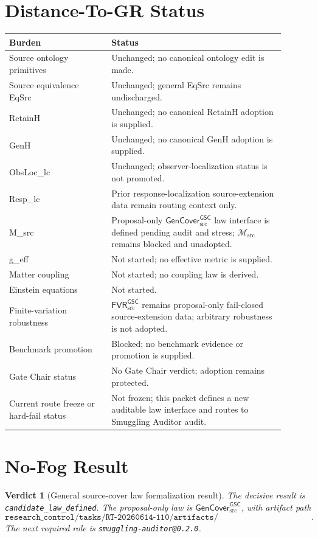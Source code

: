 \documentclass[11pt]{article}
\newcommand{\Msrc}{\mathcal{M}_{\mathrm{src}}}
\newcommand{\FVRSrc}{\mathsf{FVR}_{\mathrm{src}}^{\mathsf{GSC}}}
\newcommand{\GenCover}{\mathsf{GenCover}_{\mathrm{src}}^{\mathsf{GSC}}}
\newtheorem{verdict}{Verdict}
\begin{document}
\section{Distance-To-GR Status}

\begin{center}
\begin{tabular}{p{0.33\linewidth}p{0.57\linewidth}}
\hline
Burden & Status \\
\hline
Source ontology primitives & Unchanged; no canonical ontology edit is made. \\
Source equivalence EqSrc & Unchanged; general EqSrc remains undischarged. \\
RetainH & Unchanged; no canonical RetainH adoption is supplied. \\
GenH & Unchanged; no canonical GenH adoption is supplied. \\
ObsLoc\_lc & Unchanged; observer-localization status is not promoted. \\
Resp\_lc & Prior response-localization source-extension data remain routing context only. \\
M\_src & Proposal-only \(\GenCover\) law interface is defined pending audit and stress; \(\Msrc\) remains blocked and unadopted. \\
g\_eff & Not started; no effective metric is supplied. \\
Matter coupling & Not started; no coupling law is derived. \\
Einstein equations & Not started. \\
Finite-variation robustness & \(\FVRSrc\) remains proposal-only fail-closed source-extension data; arbitrary robustness is not adopted. \\
Benchmark promotion & Blocked; no benchmark evidence or promotion is supplied. \\
Gate Chair status & No Gate Chair verdict; adoption remains protected. \\
Current route freeze or hard-fail status & Not frozen; this packet defines a new auditable law interface and routes to Smuggling Auditor audit. \\
\hline
\end{tabular}
\end{center}

\section{No-Fog Result}

\begin{verdict}[General source-cover law formalization result]
The decisive result is \texttt{candidate\_law\_defined}. The proposal-only
law is \(\GenCover\), with artifact path
\[
\texttt{research\_control/tasks/RT-20260614-110/artifacts/148\_RESP\_LC\_M\_SRC\_GSC\_GENERAL\_SOURCE\_COVER\_LAW\_FORMALIZATION.tex}.
\]
The next required role is \texttt{smuggling-auditor@0.2.0}.
\end{verdict}
\end{document}
